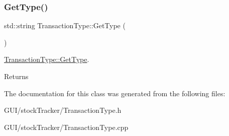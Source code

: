 \subsubsection{\texorpdfstring{Get\+Type()}{GetType()}}
{\footnotesize\ttfamily std\+::string Transaction\+Type\+::\+Get\+Type (\begin{DoxyParamCaption}{ }\end{DoxyParamCaption})}



\mbox{\hyperlink{class_transaction_type_a2253c4366ecd89e2f4d31888527e47dc}{Transaction\+Type\+::\+Get\+Type}}. 

\begin{DoxyReturn}{Returns}

\end{DoxyReturn}


The documentation for this class was generated from the following files\+:\begin{DoxyCompactItemize}
\item 
G\+U\+I/stock\+Tracker/Transaction\+Type.\+h\item 
G\+U\+I/stock\+Tracker/Transaction\+Type.\+cpp\end{DoxyCompactItemize}
